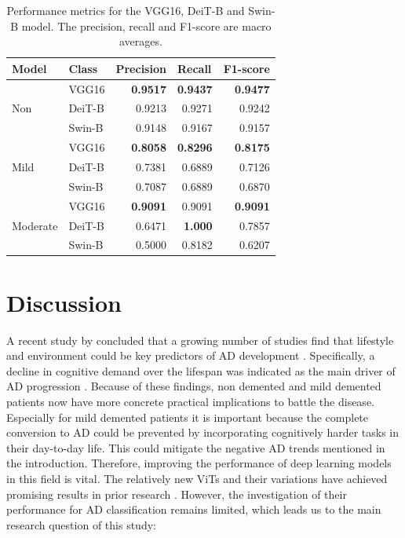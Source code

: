 \documentclass[11pt, a4paper]{article}
\begin{document}
\begin{table}[]
    \centering
    \begin{tabular}{@{}llrrr@{}}
    \toprule
    Model & Class & \multicolumn{1}{l}{Precision} & \multicolumn{1}{l}{Recall} & \multicolumn{1}{l}{F1-score} \\ \midrule
             & VGG16  & \textbf{0.9517} & \textbf{0.9437} & \textbf{0.9477} \\
    Non      & DeiT-B & 0.9213          & 0.9271          & 0.9242          \\
             & Swin-B & 0.9148          & 0.9167          & 0.9157          \\ \midrule
             & VGG16  & \textbf{0.8058} & \textbf{0.8296} & \textbf{0.8175} \\
    Mild     & DeiT-B & 0.7381          & 0.6889          & 0.7126          \\
             & Swin-B & 0.7087          & 0.6889          & 0.6870          \\ \midrule
             & VGG16  & \textbf{0.9091} & 0.9091          & \textbf{0.9091} \\
    Moderate & DeiT-B & 0.6471          & \textbf{1.000}  & 0.7857          \\
             & Swin-B & 0.5000          & 0.8182          & 0.6207          \\ \bottomrule
    
    \end{tabular}
    \caption{Performance metrics for the VGG16, DeiT-B and Swin-B model. The precision, recall and F1-score are macro averages.}
    \label{tab:pperclass}
\end{table}

\newpage

\section{Discussion}
A recent study by \cite{Turknett2022DemandDementia} concluded that a growing number of studies find that lifestyle and environment could be key predictors of AD development \citep{Yu2020Evidence-basedTrials.,Sundstrom2020ARisk}. Specifically, a decline in cognitive demand over the lifespan was indicated as the main driver of AD progression \citep{Turknett2022DemandDementia}. Because of these findings, non demented and mild demented patients now have more concrete practical implications to battle the disease. Especially for mild demented patients it is important because the complete conversion to AD could be prevented by incorporating cognitively harder tasks in their day-to-day life. This could mitigate the negative AD trends mentioned in the introduction. Therefore, improving the performance of deep learning models in this field is vital. The relatively new ViTs and their variations have achieved promising results in prior research \citep{Fang2021YouDetection, Ye2019Cross-modalSegmentation, Dosovitskiy2020AnScale}. However, the investigation of their performance for AD classification remains limited, which leads us to the main research question of this study:
\end{document}
